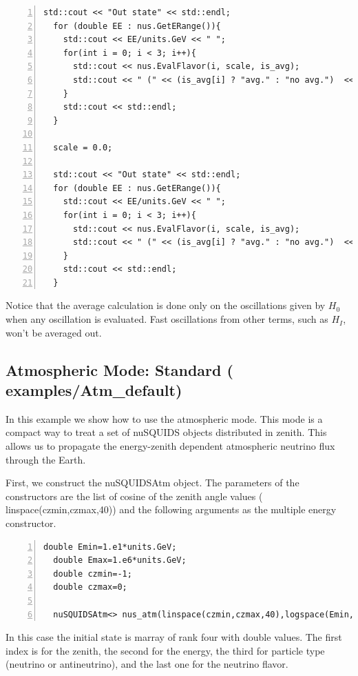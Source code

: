 \documentclass[3p,12pt]{elsarticle}
\newcommand{\ttf}{\ttfamily}
\begin{document}
\begin{lstlisting}[frame=leftline, numbers =
  left,breaklines=true,label = ex:sin1]
    std::cout << "Out state" << std::endl;
  for (double EE : nus.GetERange()){
    std::cout << EE/units.GeV << " ";
    for(int i = 0; i < 3; i++){
      std::cout << nus.EvalFlavor(i, scale, is_avg);
      std::cout << " (" << (is_avg[i] ? "avg." : "no avg.")  << ") ";
    }
    std::cout << std::endl;
  }

  scale = 0.0;

  std::cout << "Out state" << std::endl;
  for (double EE : nus.GetERange()){
    std::cout << EE/units.GeV << " ";
    for(int i = 0; i < 3; i++){
      std::cout << nus.EvalFlavor(i, scale, is_avg);
      std::cout << " (" << (is_avg[i] ? "avg." : "no avg.")  << ") ";
    }
    std::cout << std::endl;
  }
\end{lstlisting}

Notice that the average calculation is done only on the
oscillations given by $H_0$ when any oscillation is evaluated. Fast
oscillations from other terms, such as $H_I$, won't be
averaged out.


\subsection{Atmospheric Mode: Standard \textnormal{({\ttf
      examples/Atm\_default})}}
\label{sec:atmexample}
In this example we show how to use the atmospheric mode. This mode is
a compact way to treat a set of nuSQUIDS objects distributed in
zenith.
This allows us to propagate the energy-zenith dependent atmospheric
neutrino flux through the Earth.

First, we construct the nuSQUIDSAtm object. The parameters of the
constructors are the list of cosine of the zenith angle values ({\ttf
  linspace(czmin,czmax,40)}) and the following arguments as the
multiple energy constructor.

\begin{lstlisting}[frame=leftline, numbers =
  left,breaklines=true,label = ex:sin1]
  double Emin=1.e1*units.GeV;
  double Emax=1.e6*units.GeV;
  double czmin=-1;
  double czmax=0;

  nuSQUIDSAtm<> nus_atm(linspace(czmin,czmax,40),logspace(Emin,Emax,100),numneu,both,interactions);
\end{lstlisting}

In this case the initial state is marray of rank four with double values.  
The first index is for the zenith, the second for the energy, the
third for particle type (neutrino or antineutrino), and the last one
for the neutrino flavor.
\end{document}
